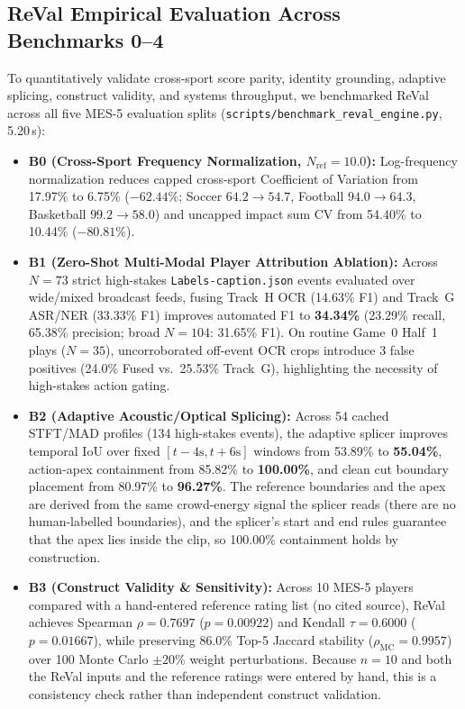 \documentclass[10pt,twocolumn,letterpaper]{article}
\begin{document}
\subsection{ReVal Empirical Evaluation Across Benchmarks 0--4}
To quantitatively validate cross-sport score parity, identity grounding, adaptive splicing, construct validity, and systems throughput, we benchmarked ReVal across all five MES-5 evaluation splits (\texttt{scripts/benchmark\_reval\_engine.py}, 5.20\,s):
\begin{itemize}
    \item \textbf{B0 (Cross-Sport Frequency Normalization, $N_{\text{ref}}=10.0$):} Log-frequency normalization reduces capped cross-sport Coefficient of Variation from 17.97\% to 6.75\% ($-62.44\%$; Soccer $64.2 \to 54.7$, Football $94.0 \to 64.3$, Basketball $99.2 \to 58.0$) and uncapped impact sum CV from 54.40\% to 10.44\% ($-80.81\%$).
    \item \textbf{B1 (Zero-Shot Multi-Modal Player Attribution Ablation):} Across $N=73$ strict high-stakes \texttt{Labels-caption.json} events evaluated over wide/mixed broadcast feeds, fusing Track~H OCR (14.63\% F1) and Track~G ASR/NER (33.33\% F1) improves automated F1 to \textbf{34.34\%} (23.29\% recall, 65.38\% precision; broad $N=104$: 31.65\% F1). On routine Game~0 Half~1 plays ($N=35$), uncorroborated off-event OCR crops introduce 3 false positives (24.0\% Fused vs.\ 25.53\% Track~G), highlighting the necessity of high-stakes action gating.
    \item \textbf{B2 (Adaptive Acoustic/Optical Splicing):} Across 54 cached STFT/MAD profiles (134 high-stakes events), the adaptive splicer improves temporal IoU over fixed $[t-4\text{s}, t+6\text{s}]$ windows from 53.89\% to \textbf{55.04\%}, action-apex containment from 85.82\% to \textbf{100.00\%}, and clean cut boundary placement from 80.97\% to \textbf{96.27\%}. The reference boundaries and the apex are derived from the same crowd-energy signal the splicer reads (there are no human-labelled boundaries), and the splicer's start and end rules guarantee that the apex lies inside the clip, so 100.00\% containment holds by construction.
    \item \textbf{B3 (Construct Validity \& Sensitivity):} Across 10 MES-5 players compared with a hand-entered reference rating list (no cited source), ReVal achieves Spearman $\rho = 0.7697$ ($p = 0.00922$) and Kendall $\tau = 0.6000$ ($p = 0.01667$), while preserving 86.0\% Top-5 Jaccard stability ($\rho_{\text{MC}} = 0.9957$) over 100 Monte Carlo $\pm 20\%$ weight perturbations. Because $n=10$ and both the ReVal inputs and the reference ratings were entered by hand, this is a consistency check rather than independent construct validation.

\end{itemize}
\end{document}
